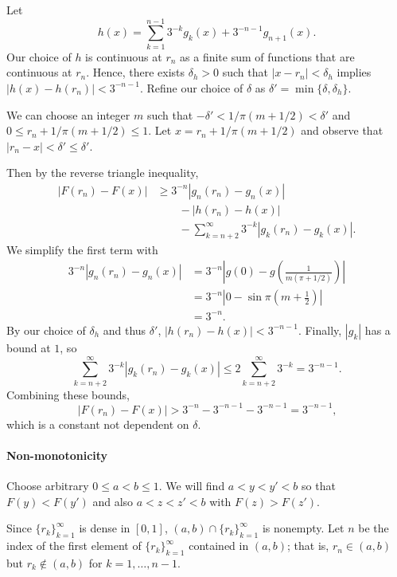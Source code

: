\documentclass[oneside]{article}
\newcommand\abs[1]{\left|#1\right|}
\begin{document}
\begin{enumerate}[label=(\alph*)]
      Let \[
        h(x) = \sum_{k=1}^{n-1} 3^{-k} g_k(x) + 3^{-n-1}g_{n+1}(x) \text{.}
      \] Our choice of $h$ is continuous at $r_n$ as a finite sum of functions that are continuous at $r_n$. Hence, there exists $\delta_h>0$ such that $\abs{x - r_n} < \delta_h$ implies $\abs{h(x) - h(r_n)}<3^{-n-1}$. Refine our choice of $\delta$ as $\delta' = \min\{\delta, \delta_h\}$.

      We can choose an integer $m$ such that $-\delta' < 1/\pi(m + 1/2) < \delta'$ and $0 \leq r_n + 1/\pi(m + 1/2) \leq 1$. Let $x = r_n + 1/\pi(m + 1/2)$ and observe that $\abs{r_n - x} < \delta' \leq \delta'$.

      Then by the reverse triangle inequality,\begin{align*}
        \abs{F(r_n) - F(x)}
        &\geq3^{-n}\abs{g_n(r_n) - g_n(x)} \\
        &\qquad- \abs{h(r_n) - h(x)} \\
        &\qquad- \sum_{k=n+2}^\infty 3^{-k}\abs{g_k(r_n) - g_k(x)} \text{.}
      \end{align*} We simplify the first term with\begin{align*}
        3^{-n}\abs{g_n(r_n) - g_n(x)}
        &= 3^{-n}\abs{g(0) - g\left(\frac{1}{m(\pi + 1/2)}\right)} \\
        &= 3^{-n}\abs{0 - \sin\pi \left(m + \frac12\right)} \\
        &= 3^{-n} \text{.}
      \end{align*} By our choice of $\delta_h$ and thus $\delta'$, $\abs{h(r_n) - h(x)} < 3^{-n-1}$. Finally, $\abs{g_k}$ has a bound at $1$, so \[
        \sum_{k=n+2}^\infty 3^{-k}\abs{g_k(r_n) - g_k(x)}
        \leq 2\sum_{k=n+2}^\infty 3^{-k}
        = 3^{-n-1} \text{.}
      \] Combining these bounds, \[
        \abs{F(r_n) - F(x)} > 3^{-n} - 3^{-n-1} - 3^{-n-1} = 3^{-n-1} \text{,}
      \] which is a constant not dependent on $\delta$.

      \paragraph{Non-monotonicity} Choose arbitrary $0 \leq a < b \leq 1$. We will find $a < y < y' < b$ so that $F(y) < F(y')$ and also $a < z < z' < b$ with $F(z) > F(z')$.

      Since $\{r_k\}_{k=1}^\infty$ is dense in $[0,1]$, $(a, b) \cap \{r_k\}_{k=1}^\infty$ is nonempty. Let $n$ be the index of the first element of 
      $\{r_k\}_{k=1}^\infty$ contained in $(a, b)$; that is, $r_n \in (a, b)$ but $r_k \notin (a, b)$ for $k= 1, \dots, n-1$.


\end{enumerate}
\end{document}
